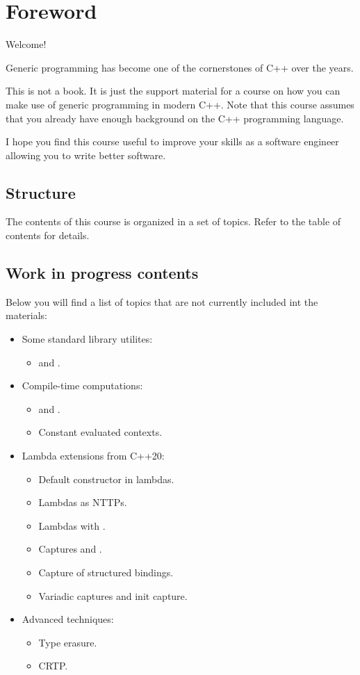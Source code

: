 \chapter*{Foreword}

Welcome!

Generic programming has become one of the cornerstones of C++ over the years.

This is not a book. It is just the support material for a course on how you can
make use of generic programming in modern C++. 
Note that this course assumes that you
already have enough background on the C++ programming language.

I hope you find this course useful to improve your skills as a software
engineer allowing you to write better software.

\section*{Structure}

The contents of this course is organized in a set of topics. 
Refer to the table of contents for details.

\section*{Work in progress contents}

Below you will find a list of topics that are not currently included int the materials:

\begin{itemize}
  \item Some standard library utilites:
    \begin{itemize}
      \item {} and .
    \end{itemize}
  \item Compile-time computations:
    \begin{itemize}
      \item {} and .
      \item Constant evaluated contexts.
    \end{itemize}
  \item Lambda extensions from C++20:
    \begin{itemize}
      \item Default constructor in lambdas.
      \item Lambdas as NTTPs.
      \item Lambdas with .
      \item Captures \cppkey{[=,this]} and \cppkey{[*this]}.
      \item Capture of structured bindings.
      \item Variadic captures and init capture.
    \end{itemize}
  \item Advanced techniques:
    \begin{itemize}
      \item Type erasure.
      \item CRTP.
    \end{itemize}
\end{itemize}
